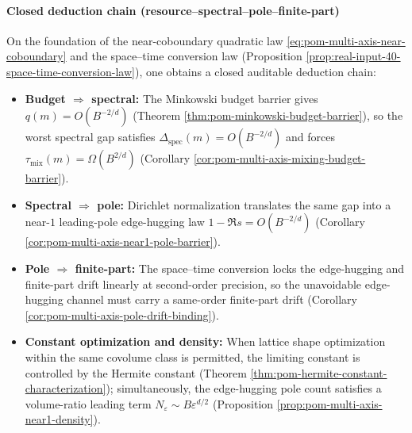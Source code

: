 \paragraph{Closed deduction chain (resource--spectral--pole--finite-part)}
On the foundation of the near-coboundary quadratic law \eqref{eq:pom-multi-axis-near-coboundary} and the space--time conversion law (Proposition \ref{prop:real-input-40-space-time-conversion-law}), one obtains a closed auditable deduction chain:
\begin{itemize}
  \item \textbf{Budget \(\Rightarrow\) spectral:} The Minkowski budget barrier gives \(q(m)=O(B^{-2/d})\) (Theorem \ref{thm:pom-minkowski-budget-barrier}), so the worst spectral gap satisfies \(\Delta_{\mathrm{spec}}(m)=O(B^{-2/d})\) and forces \(\tau_{\mathrm{mix}}(m)=\Omega(B^{2/d})\) (Corollary \ref{cor:pom-multi-axis-mixing-budget-barrier}).
  \item \textbf{Spectral \(\Rightarrow\) pole:} Dirichlet normalization translates the same gap into a near-\(1\) leading-pole edge-hugging law \(1-\Re s=O(B^{-2/d})\) (Corollary \ref{cor:pom-multi-axis-near1-pole-barrier}).
  \item \textbf{Pole \(\Rightarrow\) finite-part:} The space--time conversion locks the edge-hugging and finite-part drift linearly at second-order precision, so the unavoidable edge-hugging channel must carry a same-order finite-part drift (Corollary \ref{cor:pom-multi-axis-pole-drift-binding}).
  \item \textbf{Constant optimization and density:} When lattice shape optimization within the same covolume class is permitted, the limiting constant is controlled by the Hermite constant (Theorem \ref{thm:pom-hermite-constant-characterization}); simultaneously, the edge-hugging pole count satisfies a volume-ratio leading term \(N_\varepsilon\sim B\varepsilon^{d/2}\) (Proposition \ref{prop:pom-multi-axis-near1-density}).
\end{itemize}



